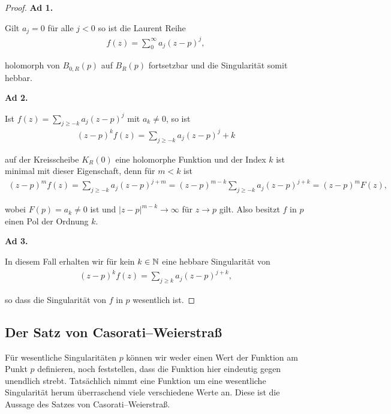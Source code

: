 \begin{proof}
 \textbf{Ad 1.}

\par
Gilt \(a_j=0\) für alle \(j<0\) so ist die Laurent Reihe
\begin{align*}
f(z) = \sum_{0}^\infty a_j (z-p)^j,
\end{align*}
\par
holomorph von \(B_{0,R}(p)\) auf \(B_R(p)\) fortsetzbar und die Singularität somit hebbar.

\par
\textbf{Ad 2.}

\par
Ist \(f(z) = \sum_{j \geq -k} a_j (z-p)^j\) mit \(a_k \neq 0\), so ist
\begin{align*}
(z-p)^k f(z) = \sum_{j \geq -k} a_j (z-p)^j+k
\end{align*}
\par
auf der Kreisscheibe \(K_R(0)\) eine holomorphe Funktion und der Index \(k\) ist minimal mit dieser Eigenschaft, denn für \(m < k\) ist
\begin{align*}
(z-p)^m f(z) = \sum_{j \geq -k} a_j (z-p)^{j+m} = (z-p)^{m-k} \sum_{j \geq -k} a_j (z-p)^{j+k} = (z-p)^m F(z),
\end{align*}
\par
wobei \(F(p) = a_k \neq 0\) ist und \(|z-p|^{m-k} \rightarrow \infty\) für \(z \rightarrow p\) gilt.
Also besitzt \(f\) in \(p\) einen Pol der Ordnung \(k\).

\par
\textbf{Ad 3.}

\par
In diesem Fall erhalten wir für kein \(k \in \mathbb{N}\) eine hebbare Singularität von
\begin{align*}
(z-p)^k f(z) = \sum_{j \geq k} a_j (z-p)^{j+k},
\end{align*}
\par
so dass die Singularität von \(f\) in \(p\) wesentlich ist.
\end{proof}


\subsection{Der Satz von Casorati–Weierstraß}
\label{\detokenize{complexanalysis/residuensatz:der-satz-von-casorati-weierstrasz}}
\par
Für wesentliche Singularitäten \(p\) können wir weder einen Wert der Funktion am Punkt \(p\) definieren, noch feststellen, dass die Funktion hier eindeutig gegen unendlich strebt. Tatsächlich nimmt eine Funktion um eine wesentliche Singularität herum überraschend viele verschiedene Werte an. Diese ist die Aussage des Satzes von Casorati–Weierstraß.

